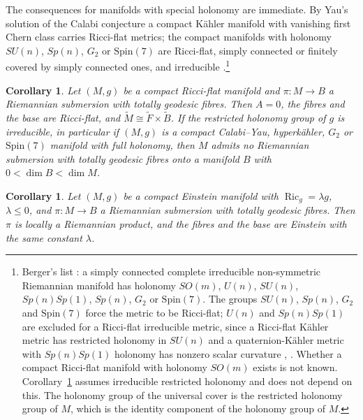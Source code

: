 \documentclass[11pt,reqno]{amsart}
\theoremstyle{plain}
\newtheorem{corollary}[theorem]{Corollary}
\theoremstyle{definition}
\newcommand{\Ric}{\operatorname{Ric}}
\newcommand{\bas}[1]{\widetilde{#1}}
\begin{document}
The consequences for manifolds with special holonomy are immediate. By Yau's solution of the Calabi conjecture \cite{Yau1978} a compact K\"ahler manifold with vanishing first Chern class carries Ricci-flat metrics; the compact manifolds with holonomy $SU(n)$, $Sp(n)$, $G_2$ or $\mathrm{Spin}(7)$ are Ricci-flat, simply connected or finitely covered by simply connected ones, and irreducible \cite{Beauville1983,Joyce2000}.\footnote{Berger's list \cite{Berger1955}: a simply connected complete irreducible non-symmetric Riemannian manifold has holonomy $SO(m)$, $U(n)$, $SU(n)$, $Sp(n)Sp(1)$, $Sp(n)$, $G_2$ or $\mathrm{Spin}(7)$. The groups $SU(n)$, $Sp(n)$, $G_2$ and $\mathrm{Spin}(7)$ force the metric to be Ricci-flat; $U(n)$ and $Sp(n)Sp(1)$ are excluded for a Ricci-flat irreducible metric, since a Ricci-flat K\"ahler metric has restricted holonomy in $SU(n)$ and a quaternion-K\"ahler metric with $Sp(n)Sp(1)$ holonomy has nonzero scalar curvature \cite[Chapter 10 and Chapter 14]{Besse1987}, \cite[Chapter 3]{Joyce2000}. Whether a compact Ricci-flat manifold with holonomy $SO(m)$ exists is not known. Corollary~\ref{cor:ricciflat} assumes irreducible restricted holonomy and does not depend on this. The holonomy group of the universal cover is the restricted holonomy group of $M$, which is the identity component of the holonomy group of $M$.}

\begin{corollary}\label{cor:ricciflat}
Let $(M,g)$ be a compact Ricci-flat manifold and $\pi\colon M\to B$ a Riemannian submersion with totally geodesic fibres. Then $A=0$, the fibres and the base are Ricci-flat, and $\bas M\cong\bas F\times\bas B$. If the restricted holonomy group of $g$ is irreducible, in particular if $(M,g)$ is a compact Calabi--Yau, hyperk\"ahler, $G_2$ or $\mathrm{Spin}(7)$ manifold with full holonomy, then $M$ admits no Riemannian submersion with totally geodesic fibres onto a manifold $B$ with $0<\dim B<\dim M$.
\end{corollary}

\begin{corollary}\label{cor:einstein}
Let $(M,g)$ be a compact Einstein manifold with $\Ric_g=\lambda g$, $\lambda\le0$, and $\pi\colon M\to B$ a Riemannian submersion with totally geodesic fibres. Then $\pi$ is locally a Riemannian product, and the fibres and the base are Einstein with the same constant $\lambda$.
\end{corollary}
\end{document}

